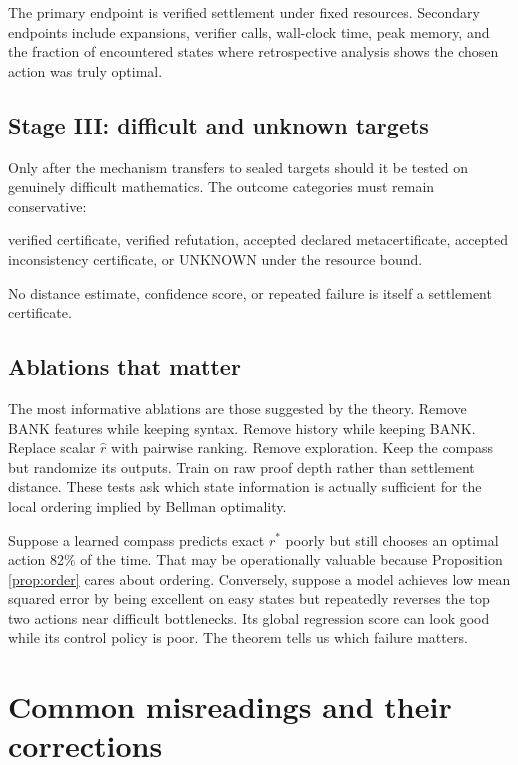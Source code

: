 \documentclass[11pt,letterpaper]{article}
\theoremstyle{remark}
\newcommand{\rstar}{r^{\!*}}
\newcommand{\rhat}{\widehat r}
\begin{document}
The primary endpoint is verified settlement under fixed resources. Secondary endpoints include expansions, verifier calls, wall-clock time, peak memory, and the fraction of encountered states where retrospective analysis shows the chosen action was truly optimal.

\subsection{Stage III: difficult and unknown targets}

Only after the mechanism transfers to sealed targets should it be tested on genuinely difficult mathematics. The outcome categories must remain conservative:
\begin{center}
verified certificate, verified refutation, accepted declared metacertificate, accepted inconsistency certificate, or UNKNOWN under the resource bound.
\end{center}
No distance estimate, confidence score, or repeated failure is itself a settlement certificate.

\subsection{Ablations that matter}

The most informative ablations are those suggested by the theory. Remove BANK features while keeping syntax. Remove history while keeping BANK. Replace scalar $\rhat$ with pairwise ranking. Remove exploration. Keep the compass but randomize its outputs. Train on raw proof depth rather than settlement distance. These tests ask which state information is actually sufficient for the local ordering implied by Bellman optimality.

\begin{storybox}
Suppose a learned compass predicts exact $\rstar$ poorly but still chooses an optimal action 82\% of the time. That may be operationally valuable because Proposition \ref{prop:order} cares about ordering. Conversely, suppose a model achieves low mean squared error by being excellent on easy states but repeatedly reverses the top two actions near difficult bottlenecks. Its global regression score can look good while its control policy is poor. The theorem tells us which failure matters.
\end{storybox}

\section{Common misreadings and their corrections}\label{sec:misreadings}
\end{document}

